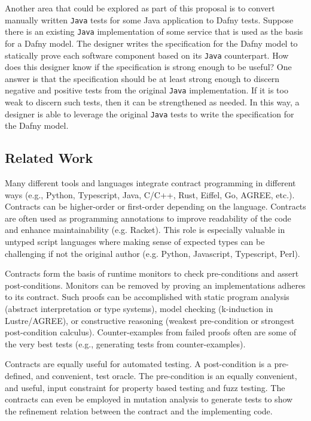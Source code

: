 \documentclass[11pt,onecolumn,notitlepage]{article}
\begin{document}
Another area that could be explored as part of this proposal is to convert manually written \texttt{Java} tests for some Java application to Dafny tests. Suppose there is an existing \texttt{Java} implementation of some service that is used as the basis for a Dafny model. The designer writes the specification for the Dafny model to statically prove each software component based on its \texttt{Java} counterpart. How does this designer know if the specification is strong enough to be useful? One answer is that the specification should be at least strong enough to discern negative and positive tests from the original \texttt{Java} implementation. If it is too weak to discern such tests, then it can be strengthened as needed. In this way, a designer is able to leverage the original \texttt{Java} tests to write the specification for the Dafny model.
 
\subsection*{Related Work}

Many different tools and languages integrate contract programming in different ways (e.g., Python, Typescript, Java, C/C++, Rust, Eiffel, Go, AGREE, etc.). Contracts can be higher-order or first-order depending on the language. Contracts are often used as programming annotations to improve readability of the code and enhance maintainability (e.g. Racket). This role is especially valuable in untyped script languages where making sense of expected types can be challenging if not the original author (e.g. Python, Javascript, Typescript, Perl). 

Contracts form the basis of runtime monitors to check pre-conditions and assert post-conditions. Monitors can be removed by proving an implementations adheres to its contract. Such proofs can be accomplished with static program analysis (abstract interpretation or type systems), model checking (k-induction in Lustre/AGREE), or constructive reasoning (weakest pre-condition or strongest post-condition calculus). Counter-examples from failed proofs often are some of the very best tests (e.g., generating tests from counter-examples).

Contracts are equally useful for automated testing. A post-condition is a pre-defined, and convenient, test oracle. The pre-condition is an equally convenient, and useful, input constraint for property based testing and fuzz testing. The contracts can even be employed in mutation analysis to generate tests to show the refinement relation between the contract and the implementing code. 
\end{document}
